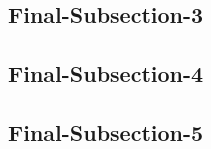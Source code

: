 
\subsection{Final-Subsection-3}

\lipsum[4-6]




\subsection{Final-Subsection-4}
\lipsum[10-11]
\newpage
\subsection{Final-Subsection-5}
\lipsum[12-13]